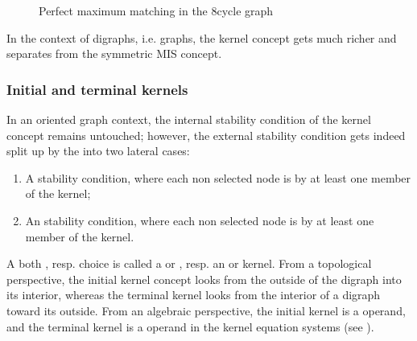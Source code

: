 \documentclass[a4paper,12pt,english]{sphinxhowto}
\let\sphinxpxdimen\pdfpxdimen\else\newdimen\sphinxpxdimen
\begin{document}
\begin{figure}[H]
\centering
\capstart

\noindent\sphinxincludegraphics[width=300\sphinxpxdimen]{{maxMatchingcycleGraph}.png}
\caption{Perfect maximum matching in the 8\sphinxhyphen{}cycle graph}\label{\detokenize{pearls:id102}}\end{figure}

\sphinxAtStartPar
In the context of digraphs, i.e.  graphs, the kernel concept gets much richer and separates from the symmetric MIS concept.


\subsubsection{Initial and terminal kernels}
\label{\detokenize{pearls:initial-and-terminal-kernels}}
\sphinxAtStartPar
In an oriented graph context, the internal stability condition of the kernel concept remains untouched; however, the external stability condition gets indeed split up by the  into two lateral cases:
\begin{enumerate}
%
\item {} 
\sphinxAtStartPar
A  stability condition, where each non selected node is  by at least one member of the kernel;

\item {} 
\sphinxAtStartPar
An  stability condition, where each non selected node is  by at least one member of the kernel.

\end{enumerate}

\sphinxAtStartPar
A both   , resp.  choice is called a  or , resp. an  or  kernel. From a topological perspective, the initial kernel concept looks from the outside of the digraph into its interior, whereas the terminal kernel looks from the interior of a digraph toward its outside. From an algebraic perspective, the initial kernel is a  operand, and the terminal kernel is a  operand in the kernel equation systems (see ).
\end{document}
